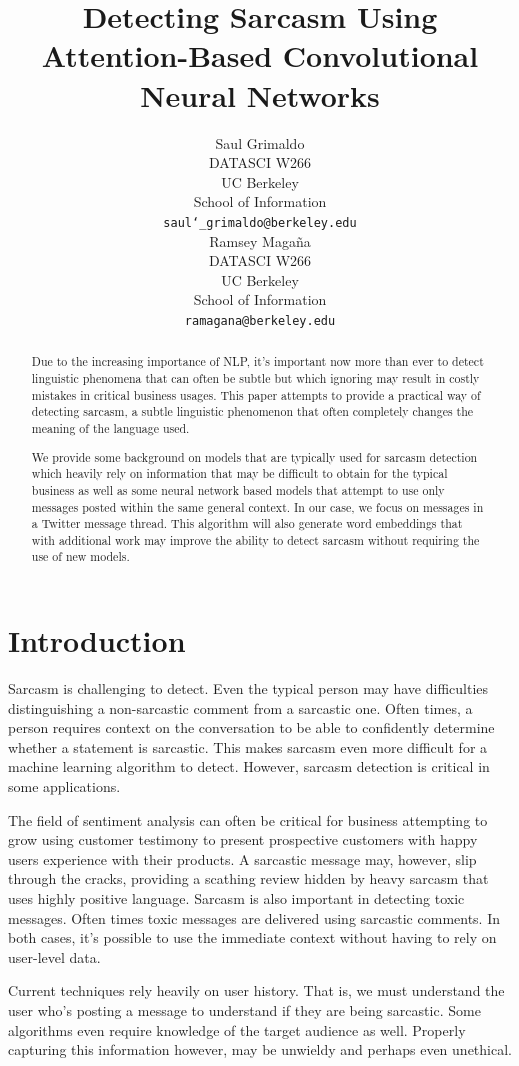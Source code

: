 \documentclass[11pt,a4paper]{article}
\title{Detecting Sarcasm Using Attention-Based Convolutional Neural Networks}
\author{Saul Grimaldo \\
  DATASCI W266\\
  UC Berkeley \\
  School of Information \\
  {\tt saul\char`_grimaldo@berkeley.edu} \\\And
  Ramsey Maga{\~n}a \\
  DATASCI W266\\
  UC Berkeley \\
  School of Information \\
  {\tt ramagana@berkeley.edu} \\}
\date{}
\begin{document}
\maketitle
\begin{abstract}
Due to the increasing importance of NLP, it's important now more than ever to detect linguistic phenomena that can often be subtle but which ignoring may result in costly mistakes in critical business usages. This paper attempts to provide a practical way of detecting sarcasm, a subtle linguistic phenomenon that often completely changes the meaning of the language used. 

We provide some background on models that are typically used for sarcasm detection which heavily rely on information that may be difficult to obtain for the typical business as well as some neural network based models that attempt to use only messages posted within the same general context. In our case, we focus on messages in a Twitter message thread. This algorithm will also generate word embeddings that with additional work may improve the ability to detect sarcasm without requiring the use of new models.
\end{abstract}

\section{Introduction}
Sarcasm is challenging to detect. Even the typical person may have difficulties distinguishing a non-sarcastic comment from a sarcastic one. Often times, a person requires context on the conversation to be able to confidently determine whether a statement is sarcastic. This makes sarcasm even more difficult for a machine learning algorithm to detect. However, sarcasm detection is critical in some applications. 

The field of sentiment analysis can often be critical for business attempting to grow using customer testimony to present prospective customers with happy users experience with their products. A sarcastic message may, however, slip through the cracks, providing a scathing review hidden by heavy sarcasm that uses highly positive language. Sarcasm is also important in detecting toxic messages. Often times toxic messages are delivered using sarcastic comments. In both cases, it's possible to use the immediate context without having to rely on user-level data.

Current techniques rely heavily on user history. That is, we must understand the user who's posting a message to understand if they are
being sarcastic. Some algorithms even require knowledge of the target audience as well. Properly capturing this information however, may be unwieldy and perhaps even unethical. 
\end{document}
